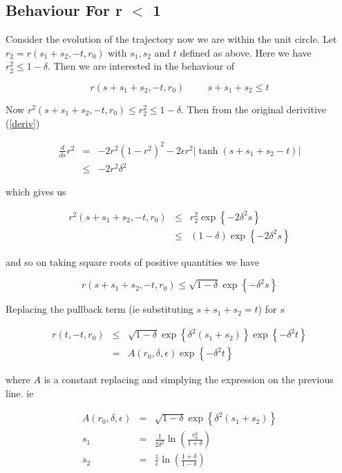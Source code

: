 \subsection{Behaviour For r $<$ 1}

Consider the evolution of the trajectory now we are within the unit circle. Let $r_{2} = r(s_1+s_{2},-t,r_{0})$ with $s_1, s_2$ and $t$ defined as above. Here we have $r_2^2 \leq 1-\delta$. Then we are interested in the behaviour of

\begin{equation}
  r(s+s_{1}+s_{2},-t,r_{0}) \hspace{1cm} s+s_1+s_2 \leq t
\end{equation}

Now $ r^2(s+s_{1}+s_{2},-t,r_{0}) \leq r_2^2 \leq 1 - \delta$.
Then from the original derivitive (\ref{deriv})

\begin{eqnarray*}
  \frac{d}{ds} r^2  & = & - 2r^2(1-r^2)^2 - 2 \epsilon r^2 |\tanh(s+s_1+s_2-t)| \\
  & \leq & - 2r^{2}\delta^{2}
\end{eqnarray*}

which gives us

\begin{eqnarray}
r^2(s+s_1+s_2,-t,r_0) & \leq & r^2_2\exp\left\{-2\delta^{2}s                \right\} \nonumber \\
& \leq & (1-\delta)\exp\left\{-2\delta^{2}s \right\}
\end{eqnarray}

and so on taking square roots of positive quantities we have

\begin{equation}
r(s+s_1+s_2,-t,r_0) \leq \sqrt{1-\delta}\exp\left\{- \delta^{2}s \right\}
\end{equation}

Replacing the pullback term (ie substituting $s+s_1+s_2=t$) for $s$

\begin{eqnarray}
r(t,-t,r_0) & \leq & \sqrt{1-\delta} \exp\left\{\delta^2(s_1+s_2) \right\} \exp\left\{- \delta^{2}t \right\} \\
& = & A(r_0,\delta,\epsilon) \exp\left\{- \delta^{2}t \right\}
\end{eqnarray}

where $A$ is a constant replacing and simplying the expression on the previous line. ie

\begin{eqnarray*}
  A(r_0,\delta,\epsilon) & = & \sqrt{1-\delta} \exp\left\{\delta^2(s_1+s_2)             \right\} \\
  s_1 & = & \frac{1}{2 \delta^{2}} \ln \left( \frac{r_{0}^2}{1+\delta}
        \right) \\
  s_2 & = & \frac{1}{\epsilon} \ln(\frac{1+\delta}{1-\delta})
\end{eqnarray*}

